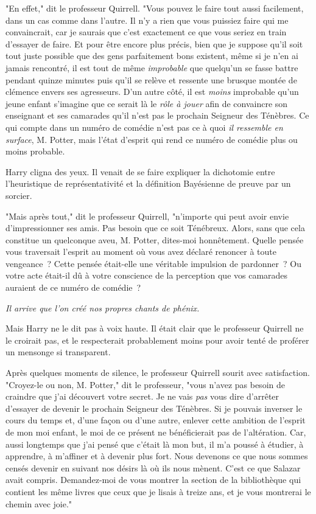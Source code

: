 "En effet," dit le professeur Quirrell. "Vous pouvez le faire tout aussi facilement, dans un cas comme dans l'autre. Il n'y a rien que vous puissiez faire qui me convaincrait, car je saurais que c'est exactement ce que vous seriez en train d'essayer de faire. Et pour être encore plus précis, bien que je suppose qu'il soit tout juste possible que des gens parfaitement bons existent, même si je n'en ai jamais rencontré, il est tout de même \emph{improbable} que quelqu'un se fasse battre pendant quinze minutes puis qu'il se relève et ressente une brusque montée de clémence envers ses agresseurs. D'un autre côté, il est \emph{moins} improbable qu'un jeune enfant s'imagine que ce serait là le \emph{rôle à jouer} afin de convaincre son enseignant et ses camarades qu'il n'est pas le prochain Seigneur des Ténèbres. Ce qui compte dans un numéro de comédie n'est pas ce à quoi \emph{il ressemble en surface}, M. Potter, mais l'état d'esprit qui rend ce numéro de comédie plus ou moins probable.

Harry cligna des yeux. Il venait de se faire expliquer la dichotomie entre l'heuristique de représentativité et la définition Bayésienne de preuve par un sorcier.

"Mais après tout," dit le professeur Quirrell, "n'importe qui peut avoir envie d'impressionner ses amis. Pas besoin que ce soit Ténébreux. Alors, sans que cela constitue un quelconque aveu, M. Potter, dites-moi honnêtement. Quelle pensée vous traversait l'esprit au moment où vous avez déclaré renoncer à toute vengeance~? Cette pensée était-elle une véritable impulsion de pardonner~? Ou votre acte était-il dû à votre conscience de la perception que vos camarades auraient de ce numéro de comédie~?

\emph{Il arrive que l'on créé nos propres chants de phénix.}

Mais Harry ne le dit pas à voix haute. Il était clair que le professeur Quirrell ne le croirait pas, et le respecterait probablement moins pour avoir tenté de proférer un mensonge si transparent.

Après quelques moments de silence, le professeur Quirrell sourit avec satisfaction. "Croyez-le ou non, M. Potter," dit le professeur, "vous n'avez pas besoin de craindre que j'ai découvert votre secret. Je ne vais \emph{pas} vous dire d'arrêter d'essayer de devenir le prochain Seigneur des Ténèbres. Si je pouvais inverser le cours du temps et, d'une façon ou d'une autre, enlever cette ambition de l'esprit de mon moi enfant, le moi de ce présent ne bénéficierait pas de l'altération. Car, aussi longtemps que j'ai pensé que c'était là mon but, il m'a poussé à étudier, à apprendre, à m'affiner et à devenir plus fort. Nous devenons ce que nous sommes censés devenir en suivant nos désirs là où ils nous mènent. C'est ce que Salazar avait compris. Demandez-moi de vous montrer la section de la bibliothèque qui contient les même livres que ceux que je lisais à treize ans, et je vous montrerai le chemin avec joie."

